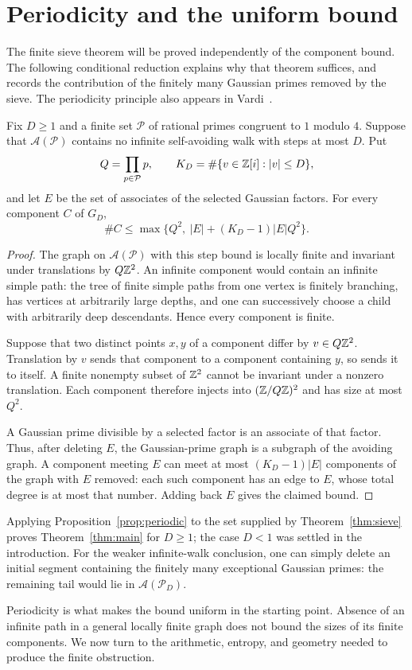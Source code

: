 \section{Periodicity and the uniform bound}\label{sec:consequences}
The finite sieve theorem will be proved independently of the component
bound. The following conditional reduction explains why that theorem
suffices, and records the contribution of the finitely many Gaussian
primes removed by the sieve. The periodicity principle also appears in
Vardi~\cite[Section 6, Proposition 6.2]{Vardi}.

\begin{proposition}
\label{prop:periodic}
Fix $D\ge1$ and a finite set $\mathcal P$ of rational primes congruent
to $1$ modulo $4$. Suppose that $\mathcal A(\mathcal P)$ contains no
infinite self-avoiding walk with steps at most $D$. Put
\[
 Q=\prod_{p\in\mathcal P}p,\qquad
 K_D=\#\{v\in\mathbb Z[i]:|v|\le D\},
\]
and let $E$ be the set of associates of the selected Gaussian factors.
For every component $C$ of $G_D$,
\[
 \#C\le\max\{Q^2,\ |E|+(K_D-1)|E|Q^2\}.
\]
\end{proposition}
\begin{proof}
The graph on $\mathcal A(\mathcal P)$ with this step bound is locally
finite and invariant under translations by $Q\mathbb Z^2$. An infinite
component would contain an infinite simple path: the tree of finite
simple paths from one vertex is finitely branching, has vertices at
arbitrarily large depths, and one can successively choose a child with
arbitrarily deep descendants. Hence every component is finite.

Suppose that two distinct points $x,y$ of a component differ by
$v\in Q\mathbb Z^2$. Translation by $v$ sends that component to a component
containing $y$, so sends it to itself. A finite nonempty subset of
$\mathbb Z^2$ cannot be invariant under a nonzero translation. Each component
therefore injects into $(\mathbb Z/Q\mathbb Z)^2$ and has size at most $Q^2$.

A Gaussian prime divisible by a selected factor is an associate of that
factor. Thus, after deleting $E$, the Gaussian-prime graph is a subgraph
of the avoiding graph. A component meeting $E$ can meet at most
$(K_D-1)|E|$ components of the graph with $E$ removed: each such
component has an edge to $E$, whose total degree is at most that number.
Adding back $E$ gives the claimed bound.
\end{proof}


Applying Proposition~\ref{prop:periodic} to the set supplied by
Theorem~\ref{thm:sieve} proves Theorem~\ref{thm:main} for $D\ge1$;
the case $D<1$ was settled in the introduction. For the weaker
infinite-walk conclusion, one can simply delete an initial segment
containing the finitely many exceptional Gaussian primes: the remaining
tail would lie in $\mathcal A(\mathcal P_D)$.

Periodicity is what makes the bound uniform in the starting point.
Absence of an infinite path in a general locally finite graph does not
bound the sizes of its finite components. We now turn to the arithmetic,
entropy, and geometry needed to produce the finite obstruction.
